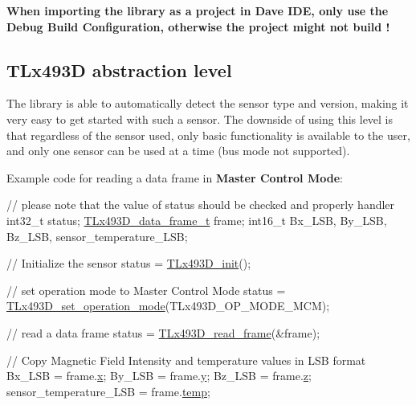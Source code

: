 {\bfseries When importing the library as a project in Dave I\+DE, only use the Debug Build Configuration, otherwise the project might not build !}\hypertarget{index_s1s1}{}\subsection{T\+Lx493\+D abstraction level}\label{index_s1s1}
The library is able to automatically detect the sensor type and version, making it very easy to get started with such a sensor. The downside of using this level is that regardless of the sensor used, only basic functionality is available to the user, and only one sensor can be used at a time (bus mode not supported). ~\newline


Example code for reading a data frame in {\bfseries Master Control Mode}\+: ~\newline
 
\begin{DoxyCode}
\textcolor{comment}{// please note that the value of status should be checked and properly handler}
int32\_t status;
\mbox{\hyperlink{struct_t_lx493_d__data__frame__t}{TLx493D\_data\_frame\_t}} frame;
int16\_t Bx\_LSB, By\_LSB, Bz\_LSB, sensor\_temperature\_LSB;

\textcolor{comment}{// Initialize the sensor}
status = \mbox{\hyperlink{_t_lx493_d_8c_ac5602c159fc8bc1085dd6ecb8bb116f2}{TLx493D\_init}}();

\textcolor{comment}{// set operation mode to Master Control Mode}
status =  \mbox{\hyperlink{_t_lx493_d_8c_a865b1090f005fdbd91faa902fbc35bfd}{TLx493D\_set\_operation\_mode}}(TLx493D\_OP\_MODE\_MCM);

\textcolor{comment}{// read a data frame}
status = \mbox{\hyperlink{_t_lx493_d_8c_accca4d20734f6066c1b9cc5389560805}{TLx493D\_read\_frame}}(&frame);

\textcolor{comment}{// Copy Magnetic Field Intensity and temperature values in LSB format}
Bx\_LSB = frame.\mbox{\hyperlink{struct_t_lx493_d__data__frame__t_ac9e9d1455533b3d2e417f2064982a31d}{x}};
By\_LSB = frame.\mbox{\hyperlink{struct_t_lx493_d__data__frame__t_a95882762f5a26aaed29610c8d4ed8b4c}{y}};
Bz\_LSB = frame.\mbox{\hyperlink{struct_t_lx493_d__data__frame__t_afc28475d31ed47440530c04d85958adb}{z}};
sensor\_temperature\_LSB = frame.\mbox{\hyperlink{struct_t_lx493_d__data__frame__t_a318d6cd91a330f561fd0bb7a36f555c8}{temp}};
\end{DoxyCode}


